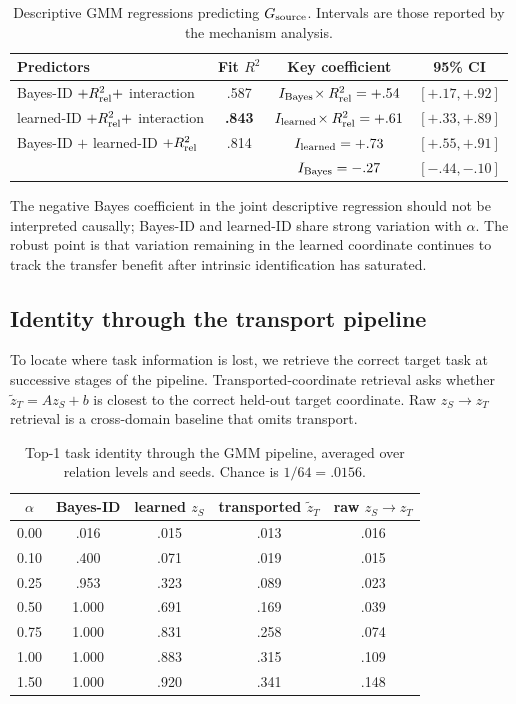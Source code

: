 \begin{table}[h]
\centering\small
\caption{Descriptive GMM regressions predicting $G_{\rm source}$. Intervals are those reported by the mechanism analysis.}
\begin{tabular}{lccc}
\toprule
Predictors & Fit $R^2$ & Key coefficient & 95\% CI\\
\midrule
Bayes-ID $+R^2_{\rm rel}+$ interaction & .587 & $I_{\rm Bayes}\!\times R^2_{\rm rel}=+.54$ & $[+.17,+.92]$\\
learned-ID $+R^2_{\rm rel}+$ interaction & \textbf{.843} & $I_{\rm learned}\!\times R^2_{\rm rel}=+.61$ & $[+.33,+.89]$\\
Bayes-ID $+$ learned-ID $+R^2_{\rm rel}$ & .814 & $I_{\rm learned}=+.73$ & $[+.55,+.91]$\\
& & $I_{\rm Bayes}=-.27$ & $[-.44,-.10]$\\
\bottomrule
\end{tabular}
\end{table}

The negative Bayes coefficient in the joint descriptive regression should not be interpreted causally; Bayes-ID and learned-ID share strong variation with $\alpha$. The robust point is that variation remaining in the learned coordinate continues to track the transfer benefit after intrinsic identification has saturated.

\subsection{Identity through the transport pipeline}

To locate where task information is lost, we retrieve the correct target task at successive stages of the pipeline. Transported-coordinate retrieval asks whether $\widetilde z_T=Az_S+b$ is closest to the correct held-out target coordinate. Raw $z_S\!\to z_T$ retrieval is a cross-domain baseline that omits transport.

\begin{table}[h]
\centering\small
\caption{Top-1 task identity through the GMM pipeline, averaged over relation levels and seeds. Chance is $1/64=.0156$.}
\begin{tabular}{ccccc}
\toprule
$\alpha$ & Bayes-ID & learned $z_S$ & transported $\widetilde z_T$ & raw $z_S\!\to z_T$\\
\midrule
0.00 & .016 & .015 & .013 & .016\\
0.10 & .400 & .071 & .019 & .015\\
0.25 & .953 & .323 & .089 & .023\\
0.50 & 1.000 & .691 & .169 & .039\\
0.75 & 1.000 & .831 & .258 & .074\\
1.00 & 1.000 & .883 & .315 & .109\\
1.50 & 1.000 & .920 & .341 & .148\\
\bottomrule
\end{tabular}
\end{table}

